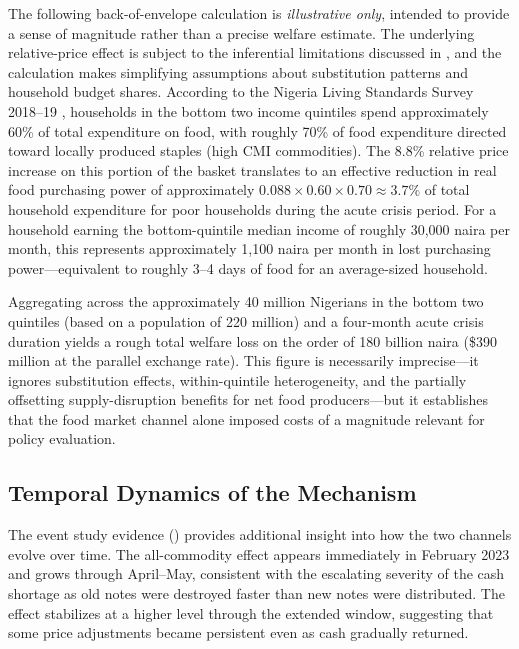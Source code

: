 \documentclass[12pt]{article}
\begin{document}
The following back-of-envelope calculation is \emph{illustrative only}, intended to provide a sense of magnitude rather than a precise welfare estimate. The underlying relative-price effect is subject to the inferential limitations discussed in , and the calculation makes simplifying assumptions about substitution patterns and household budget shares. According to the Nigeria Living Standards Survey 2018--19 \citep{nbs2020}, households in the bottom two income quintiles spend approximately 60\% of total expenditure on food, with roughly 70\% of food expenditure directed toward locally produced staples (high CMI commodities). The 8.8\% relative price increase on this portion of the basket translates to an effective reduction in real food purchasing power of approximately $0.088 \times 0.60 \times 0.70 \approx 3.7\%$ of total household expenditure for poor households during the acute crisis period. For a household earning the bottom-quintile median income of roughly 30,000 naira per month, this represents approximately 1,100 naira per month in lost purchasing power---equivalent to roughly 3--4 days of food for an average-sized household.

Aggregating across the approximately 40 million Nigerians in the bottom two quintiles (based on a population of 220 million) and a four-month acute crisis duration yields a rough total welfare loss on the order of 180 billion naira (\$390 million at the parallel exchange rate). This figure is necessarily imprecise---it ignores substitution effects, within-quintile heterogeneity, and the partially offsetting supply-disruption benefits for net food producers---but it establishes that the food market channel alone imposed costs of a magnitude relevant for policy evaluation.

\subsection{Temporal Dynamics of the Mechanism}

The event study evidence () provides additional insight into how the two channels evolve over time. The all-commodity effect appears immediately in February 2023 and grows through April--May, consistent with the escalating severity of the cash shortage as old notes were destroyed faster than new notes were distributed. The effect stabilizes at a higher level through the extended window, suggesting that some price adjustments became persistent even as cash gradually returned.
\end{document}
